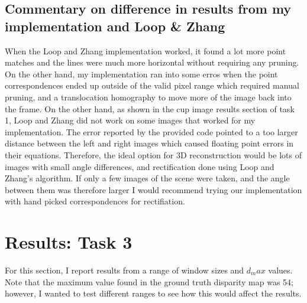 \documentclass{article}
\begin{document}
\subsection{Commentary on difference in results from my implementation and Loop \& Zhang}
When the Loop and Zhang implementation worked, it found a lot more point matches and the lines were much more horizontal without requiring any pruning. On the other hand, my implementation ran into some erros when the point correspondences ended up outside of the valid pixel range which required manual pruning, and a translocation homography to move more of the image back into the frame. On the other hand, as shown in the cup image results section of task 1, Loop and Zhang did not work on some images that worked for my implementation. The error reported by the provided code pointed to a too larger distance between the left and right images which caused floating point errors in their equations. Therefore, the ideal option for 3D reconstruction would be lots of images with small angle differences, and rectification done using Loop and Zhang's algorithm. If only a few images of the scene were taken, and the angle between them was therefore larger I would recommend trying our implementation with hand picked correspondences for rectifiation.


\section{Results: Task 3}
For this section, I report results from a range of window sizes and $d_max$ values. Note that the maximum value found in the ground truth disparity map was 54; however, I wanted to test different ranges to see how this would affect the results.
\end{document}
